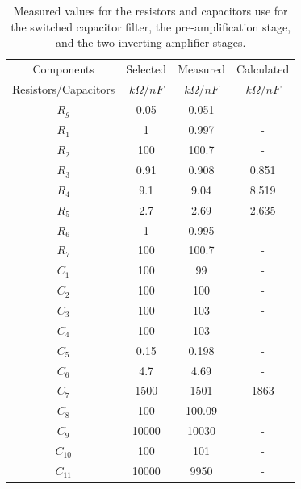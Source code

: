 \begin{table}[ht!]
\centering
\begin{tabular}{|c|c||c||c|}
	\hline
	Components & Selected & Measured & Calculated \\
    Resistors/Capacitors & $k\Omega / nF $ & $k\Omega / nF $ & $k\Omega / nF $\\\hline\hline
	$R_g$ & 0.05 & 0.051 & - \\
	\hline
    $R_1$ & 1 & 0.997 & - \\
	\hline
	  $R_2$ & 100 & 100.7 & - \\
	\hline
	$R_3$ & 0.91 & 0.908 & 0.851 \\
	\hline
	$R_4$ & 9.1 & 9.04 & 8.519 \\
	\hline
	$R_5$ & 2.7 & 2.69 & 2.635 \\
	\hline
	$R_6$ & 1 & 0.995 & - \\
	\hline
    $R_7$ & 100 & 100.7 & - \\
	\hline
	$C_1$ & 100 & 99 & - \\
	\hline
	$C_2$ & 100 & 100 & - \\
	\hline
	$C_3$ & 100 & 103 & - \\
	\hline
	$C_4$ & 100 & 103 & - \\
	\hline
    $C_5$ & 0.15 & 0.198 & - \\
	\hline
    $C_6$ & 4.7 & 4.69 & - \\
	\hline
    $C_7$ & 1500 & 1501 & 1863 \\
	\hline
    $C_8$ & 100 & 100.09 & - \\
	\hline
    $C_9$ & 10000 & 10030 & - \\
	\hline
	$C_{10}$ & 100 & 101 & - \\
	\hline
	$C_{11}$ & 10000 & 9950 & - \\
	\hline
\end{tabular}
\caption{\centering Measured values for the resistors and capacitors use for the switched capacitor filter, the pre-amplification stage, and the two inverting amplifier stages.}
\label{tab:Bauteile3}
\end{table}